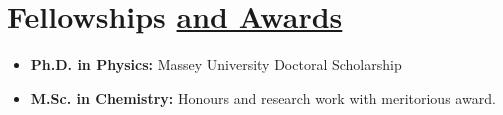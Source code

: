 \section{Fellowships \href{.}{and Awards}}

\begin{itemize}
    \itemsep-1mm
    \item {\bf Ph.D. in Physics:} Massey University Doctoral Scholarship %
    \item {\bf M.Sc. in Chemistry:} Honours and research work with
          meritorious award.
\end{itemize}
